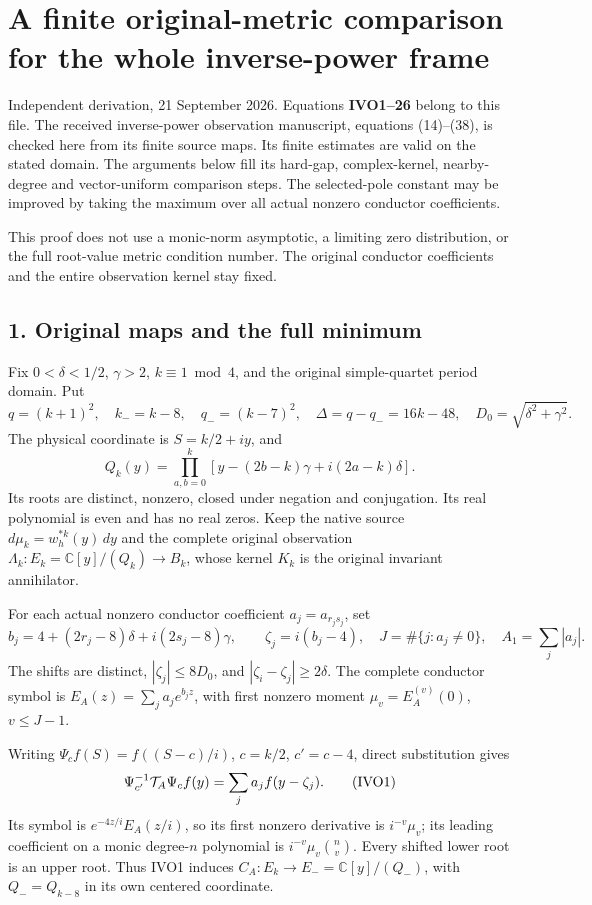 \documentclass[11pt]{article}
\begin{document}
\section{A finite original-metric comparison for the whole inverse-power frame}\label{a-finite-original-metric-comparison-for-the-whole-inverse-power-frame}

Independent derivation, 21 September 2026. Equations \textbf{IVO1--26} belong to this file. The received inverse-power observation manuscript, equations (14)--(38), is checked here from its finite source maps. Its finite estimates are valid on the stated domain. The arguments below fill its hard-gap, complex-kernel, nearby-degree and vector-uniform comparison steps. The selected-pole constant may be improved by taking the maximum over all actual nonzero conductor coefficients.

This proof does not use a monic-norm asymptotic, a limiting zero distribution, or the full root-value metric condition number. The original conductor coefficients and the entire observation kernel stay fixed.

\subsection{1. Original maps and the full minimum}\label{original-maps-and-the-full-minimum}

Fix \(0<\delta<1/2\), \(\gamma>2\), \(k\equiv1\bmod4\), and the original simple-quartet period domain. Put \[
q=(k+1)^2,\quad k_-=k-8,\quad q_-=(k-7)^2,\quad
\Delta=q-q_-=16k-48,\quad D_0=\sqrt{\delta^2+\gamma^2}.
\] The physical coordinate is \(S=k/2+iy\), and \[
Q_k(y)=\prod_{a,b=0}^k[y-(2b-k)\gamma+i(2a-k)\delta].
\] Its roots are distinct, nonzero, closed under negation and conjugation. Its real polynomial is even and has no real zeros. Keep the native source \(d\mu_k=w_h^{*k}(y)\,dy\) and the complete original observation \(\Lambda_k:E_k=\mathbb C[y]/(Q_k)\to B_k\), whose kernel \(K_k\) is the original invariant annihilator.

For each actual nonzero conductor coefficient \(a_j=a_{r_js_j}\), set \[
b_j=4+(2r_j-8)\delta+i(2s_j-8)\gamma,\qquad
\zeta_j=i(b_j-4),\quad J=\#\{j:a_j\ne0\},\quad A_1=\sum_j|a_j|.
\] The shifts are distinct, \(|\zeta_j|\le8D_0\), and \(|\zeta_i-\zeta_j|\ge2\delta\). The complete conductor symbol is \(E_A(z)=\sum_ja_je^{b_jz}\), with first nonzero moment \(\mu_v=E_A^{(v)}(0)\), \(v\le J-1\).

Writing \(\Psi_cf(S)=f((S-c)/i)\), \(c=k/2\), \(c'=c-4\), direct substitution gives \[
\Psi_{c'}^{-1}{\cal T}_A\Psi_cf(y)=\sum_ja_jf(y-\zeta_j).
\tag{IVO1}
\] Its symbol is \(e^{-4z/i}E_A(z/i)\), so its first nonzero derivative is \(i^{-v}\mu_v\); its leading coefficient on a monic degree-\(n\) polynomial is \(i^{-v}\mu_v\binom nv\). Every shifted lower root is an upper root. Thus IVO1 induces \(C_A:E_k\to E_-=\mathbb C[y]/(Q_-)\), with \(Q_-=Q_{k-8}\) in its own centered coordinate.
\end{document}
